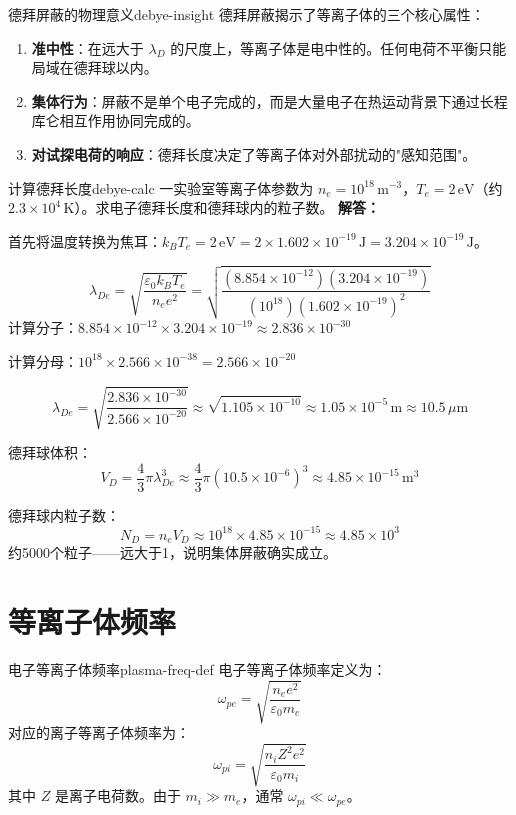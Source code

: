 \documentclass[12pt,a4paper,openany,oneside]{book}
\newcommand{\eps}{\varepsilon}
\newcommand{\difficulty}[1]{\marginnote{\hfill\textcolor{coverMid!80}{\rule[-0.1em]{2pt}{0.9em}}\,\textcolor{coverMid}{\footnotesize\textbf{[#1]}}}}
\begin{document}
\begin{insight}{德拜屏蔽的物理意义}{debye-insight}
德拜屏蔽揭示了等离子体的三个核心属性：
\begin{enumerate}
\item \textbf{准中性}：在远大于 $\lambda_D$ 的尺度上，等离子体是电中性的。任何电荷不平衡只能局域在德拜球以内。
\item \textbf{集体行为}：屏蔽不是单个电子完成的，而是大量电子在热运动背景下通过长程库仑相互作用协同完成的。
\item \textbf{对试探电荷的响应}：德拜长度决定了等离子体对外部扰动的"感知范围"。
\end{enumerate}
\end{insight}

\begin{example}{计算德拜长度}{debye-calc}
\difficulty{基础}
一实验室等离子体参数为 $n_e = 10^{18}\,\mathrm{m}^{-3}$，$T_e = 2\,\mathrm{eV}$（约 $2.3\times 10^4\,\mathrm{K}$）。求电子德拜长度和德拜球内的粒子数。
\tcblower
\textbf{解答：}

首先将温度转换为焦耳：$k_B T_e = 2\,\mathrm{eV} = 2 \times 1.602\times 10^{-19}\,\mathrm{J} = 3.204\times 10^{-19}\,\mathrm{J}$。

\[
\lambda_{De} = \sqrt{\frac{\eps_0 k_B T_e}{n_e e^2}} = \sqrt{\frac{(8.854\times 10^{-12})(3.204\times 10^{-19})}{(10^{18})(1.602\times 10^{-19})^2}}
\]
计算分子：$8.854\times 10^{-12} \times 3.204\times 10^{-19} \approx 2.836\times 10^{-30}$

计算分母：$10^{18} \times 2.566\times 10^{-38} = 2.566\times 10^{-20}$

\[
\lambda_{De} = \sqrt{\frac{2.836\times 10^{-30}}{2.566\times 10^{-20}}} \approx \sqrt{1.105\times 10^{-10}} \approx 1.05\times 10^{-5}\,\mathrm{m} \approx 10.5\,\mu\mathrm{m}
\]

德拜球体积：
\[
V_D = \frac{4}{3}\pi \lambda_{De}^3 \approx \frac{4}{3}\pi (10.5\times 10^{-6})^3 \approx 4.85\times 10^{-15}\,\mathrm{m}^3
\]

德拜球内粒子数：
\[
N_D = n_e V_D \approx 10^{18} \times 4.85\times 10^{-15} \approx 4.85\times 10^{3}
\]
约5000个粒子——远大于1，说明集体屏蔽确实成立。
\end{example}

\section{等离子体频率}\difficulty{基础}

\begin{definition}{电子等离子体频率}{plasma-freq-def}
电子等离子体频率定义为：
\[
\omega_{pe} = \sqrt{\frac{n_e e^2}{\eps_0 m_e}}
\]
对应的离子等离子体频率为：
\[
\omega_{pi} = \sqrt{\frac{n_i Z^2 e^2}{\eps_0 m_i}}
\]
其中 $Z$ 是离子电荷数。由于 $m_i \gg m_e$，通常 $\omega_{pi} \ll \omega_{pe}$。
\end{definition}
\end{document}
